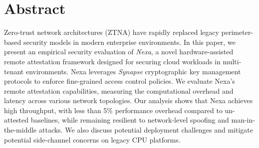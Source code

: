 \section*{Abstract}
Zero-trust network architectures (ZTNA) have rapidly replaced legacy perimeter-based security models in modern enterprise environments. In this paper, we present an empirical security evaluation of \emph{Nexa}, a novel hardware-assisted remote attestation framework designed for securing cloud workloads in multi-tenant environments. Nexa leverages \emph{Synapse} cryptographic key management protocols to enforce fine-grained access control policies. We evaluate Nexa's remote attestation capabilities, measuring the computational overhead and latency across various network topologies. Our analysis shows that Nexa achieves high throughput, with less than 5\% performance overhead compared to un-attested baselines, while remaining resilient to network-level spoofing and man-in-the-middle attacks. We also discuss potential deployment challenges and mitigate potential side-channel concerns on legacy CPU platforms.
